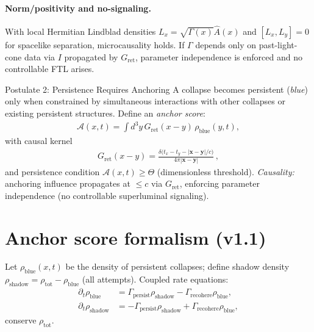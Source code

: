 \documentclass[11pt]{article}
\newcommand{\Acal}{\mathcal{A}}
\begin{document}
\paragraph{Norm/positivity and no-signaling.}
With local Hermitian Lindblad densities $L_x=\sqrt{\Gamma(x)}\hat A(x)$ and $[L_x,L_y]=0$ for spacelike separation, microcausality holds. If $\Gamma$ depends only on past-light-cone data via $I$ propagated by $G_{\mathrm{ret}}$, parameter independence is enforced and no controllable FTL arises.
\vspace{1em}

\begin{postulate}{Postulate 2: Persistence Requires Anchoring}
    A collapse becomes persistent (\emph{blue}) only when constrained by simultaneous interactions with other collapses or existing persistent structures. Define an \emph{anchor score}:
    \begin{align}
    \Acal(x,t)=\!\int\!d^3y\,G_{\mathrm{ret}}(x-y)\,\rho_{\mathrm{blue}}(y,t),
    \end{align}
    with causal kernel
    \begin{align}
    G_{\mathrm{ret}}(x-y)=\frac{\delta\big(t_x-t_y-|\mathbf{x}-\mathbf{y}|/c\big)}{4\pi|\mathbf{x}-\mathbf{y}|}\,,
    \end{align}
    and persistence condition $\Acal(x,t)\ge \Theta$ (dimensionless threshold). \emph{Causality:} anchoring influence propagates at $\le c$ via $G_{\mathrm{ret}}$, enforcing parameter independence (no controllable superluminal signaling).
\end{postulate}

\section{Anchor score formalism (v1.1)}\label{sec:anchor}
Let $\rho_{\mathrm{blue}}(x,t)$ be the density of persistent collapses; define shadow density $\rho_{\mathrm{shadow}}=\rho_{\mathrm{tot}}-\rho_{\mathrm{blue}}$ (all attempts). Coupled rate equations:
\begin{align}
\partial_t \rho_{\mathrm{blue}}&=\Gamma_{\mathrm{persist}}\rho_{\mathrm{shadow}}-\Gamma_{\mathrm{recohere}}\rho_{\mathrm{blue}}, \label{eq:blueRate}\\
\partial_t \rho_{\mathrm{shadow}}&=-\Gamma_{\mathrm{persist}}\rho_{\mathrm{shadow}}+\Gamma_{\mathrm{recohere}}\rho_{\mathrm{blue}},\label{eq:shadowRate}
\end{align}
conserve $\rho_{\mathrm{tot}}$.
\end{document}
